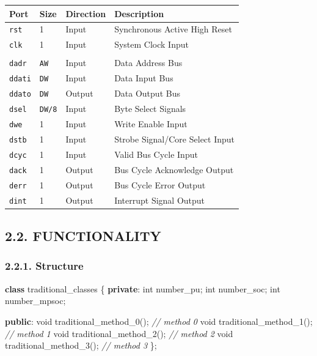 \documentclass[
]{article}
\newenvironment{Shaded}{}{}
\newcommand{\CommentTok}[1]{\textcolor[rgb]{0.38,0.63,0.69}{\textit{#1}}}
\newcommand{\DataTypeTok}[1]{\textcolor[rgb]{0.56,0.13,0.00}{#1}}
\newcommand{\KeywordTok}[1]{\textcolor[rgb]{0.00,0.44,0.13}{\textbf{#1}}}
\newcommand{\NormalTok}[1]{#1}
\begin{document}
\begin{longtable}[]{@{}llll@{}}
\toprule
Port & Size & Direction & Description\tabularnewline
\midrule
\endhead
\texttt{rst} & 1 & Input & Synchronous Active High Reset\tabularnewline
\texttt{clk} & 1 & Input & System Clock Input\tabularnewline
& & &\tabularnewline
\texttt{dadr} & \texttt{AW} & Input & Data Address Bus\tabularnewline
\texttt{ddati} & \texttt{DW} & Input & Data Input Bus\tabularnewline
\texttt{ddato} & \texttt{DW} & Output & Data Output Bus\tabularnewline
\texttt{dsel} & \texttt{DW/8} & Input & Byte Select
Signals\tabularnewline
\texttt{dwe} & 1 & Input & Write Enable Input\tabularnewline
\texttt{dstb} & 1 & Input & Strobe Signal/Core Select
Input\tabularnewline
\texttt{dcyc} & 1 & Input & Valid Bus Cycle Input\tabularnewline
\texttt{dack} & 1 & Output & Bus Cycle Acknowledge Output\tabularnewline
\texttt{derr} & 1 & Output & Bus Cycle Error Output\tabularnewline
\texttt{dint} & 1 & Output & Interrupt Signal Output\tabularnewline
\bottomrule
\end{longtable}

\hypertarget{functionality-1}{%
\subsection{2.2. FUNCTIONALITY}\label{functionality-1}}

\hypertarget{structure-1}{%
\subsubsection{2.2.1. Structure}\label{structure-1}}

\begin{Shaded}
\begin{Highlighting}[]
\KeywordTok{class}\NormalTok{ traditional\_classes \{}
   \KeywordTok{private}\NormalTok{:}
      \DataTypeTok{int}\NormalTok{ number\_pu;}
      \DataTypeTok{int}\NormalTok{ number\_soc;}
      \DataTypeTok{int}\NormalTok{ number\_mpsoc;}

   \KeywordTok{public}\NormalTok{:}
      \DataTypeTok{void}\NormalTok{ traditional\_method\_0();  }\CommentTok{// method 0}
      \DataTypeTok{void}\NormalTok{ traditional\_method\_1();  }\CommentTok{// method 1}
      \DataTypeTok{void}\NormalTok{ traditional\_method\_2();  }\CommentTok{// method 2}
      \DataTypeTok{void}\NormalTok{ traditional\_method\_3();  }\CommentTok{// method 3}
\NormalTok{\};}
\end{Highlighting}
\end{Shaded}
\end{document}

